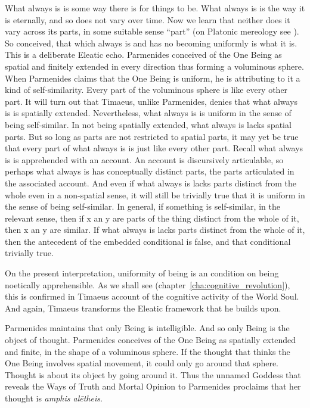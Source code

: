 What always is is some way there is for things to be. What always is is the way it is eternally, and so does not vary over time. Now we learn that neither does it vary across its parts, in some suitable sense ``part'' (on Platonic mereology see \citealt{Harte:2002tl}). So conceived, that which always is and has no becoming uniformly is what it is. This is a deliberate Eleatic echo. Parmenides conceived of the One Being as spatial and finitely extended in every direction thus forming a voluminous sphere. When Parmenides claims that the One Being is uniform, he is attributing to it a kind of self-similarity. Every part of the voluminous sphere is like every other part. It will turn out that Timaeus, unlike Parmenides, denies that what always is is spatially extended. Nevertheless, what always is is uniform in the sense of being self-similar. In not being spatially extended, what always is lacks spatial parts. But so long as parts are not restricted to spatial parts, it may yet be true that every part of what always is is just like every other part. Recall what always is is apprehended with an account. An account is discursively articulable, so perhaps what always is has conceptually distinct parts, the parts articulated in the associated account. And even if what always is lacks parts distinct from the whole even in a non-spatial sense, it will still be trivially true that it is uniform in the sense of being self-similar. In general, if something is self-similar, in the relevant sense, then if x an y are parts of the thing distinct from the whole of it, then x an y are similar. If what always is lacks parts distinct from the whole of it, then the antecedent of the embedded conditional is false, and that conditional trivially true.

On the present interpretation, uniformity of being is an condition on being noetically apprehensible. As we shall see (chapter~\ref{cha:cognitive_revolution}), this is confirmed in Timaeus account of the cognitive activity of the World Soul. And again, Timaeus transforms the Eleatic framework that he builds upon. 

Parmenides maintains that only Being is intelligible. And so only Being is the object of thought. Parmenides conceives of the One Being as spatially extended and finite, in the shape of a voluminous sphere. If the thought that thinks the One Being involves spatial movement, it could only go around that sphere. Thought is about its object by going around it. Thus the unnamed Goddess that reveals the Ways of Truth and Mortal Opinion to Parmenides proclaims that her thought is \emph{amphis alētheis}.

